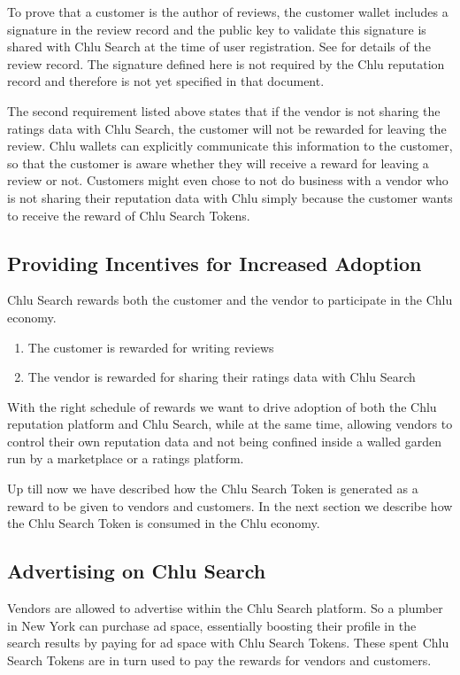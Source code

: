 \documentclass[a4paper]{article}
\begin{document}
To prove that a customer is the author of reviews, the customer wallet
includes a signature in the review record and the public key to
validate this signature is shared with Chlu Search at the time of user
registration. See \cite{chlu-repuation} for details of the review
record. The signature defined here is not required by the Chlu
reputation record and therefore is not yet specified in that document.

The second requirement listed above states that if the vendor is not
sharing the ratings data with Chlu Search, the customer will not be
rewarded for leaving the review. Chlu wallets can explicitly
communicate this information to the customer, so that the customer is
aware whether they will receive a reward for leaving a review or
not. Customers might even chose to not do business with a vendor who
is not sharing their reputation data with Chlu simply because the
customer wants to receive the reward of Chlu Search Tokens.

\subsection{Providing Incentives for Increased Adoption}

Chlu Search rewards both the customer and the vendor to participate in
the Chlu economy.

\begin{enumerate}
\item The customer is rewarded for writing reviews
\item The vendor is rewarded for sharing their ratings data with Chlu
  Search
\end{enumerate}

With the right schedule of rewards we want to drive adoption of both
the Chlu reputation platform and Chlu Search, while at the same time,
allowing vendors to control their own reputation data and not being
confined inside a walled garden run by a marketplace or a ratings
platform.

Up till now we have described how the Chlu Search Token is generated
as a reward to be given to vendors and customers. In the next section
we describe how the Chlu Search Token is consumed in the Chlu economy.

\subsection{Advertising on Chlu Search}

Vendors are allowed to advertise within the Chlu Search platform. So a
plumber in New York can purchase ad space, essentially boosting their
profile in the search results by paying for ad space with Chlu Search
Tokens. These spent Chlu Search Tokens are in turn used to pay the
rewards for vendors and customers.
\end{document}
